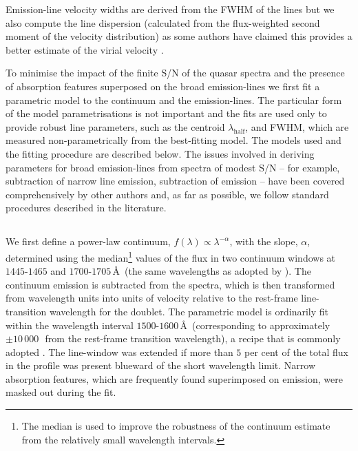Emission-line velocity widths are derived from the FWHM of the lines but we also compute the line dispersion (calculated from the flux-weighted second moment of the velocity distribution) as some authors have claimed this provides a better estimate of the virial velocity \citep{denney13}. 

To minimise the impact of the finite S/N of the quasar spectra and the presence of absorption features superposed on the broad emission-lines we first fit a parametric model to the continuum and the emission-lines. 
The particular form of the model parametrisations is not important and the fits are used only to provide robust line parameters, such as the centroid $\lambda_{\text{half}}$, and FWHM, which are measured non-parametrically from the best-fitting model. 
The models used and the fitting procedure are described below. 
The issues involved in deriving parameters for broad emission-lines from spectra of modest S/N -- for example, subtraction of narrow line emission, subtraction of  emission -- have been covered comprehensively by other authors \citep[e.g.][]{shen11,shen12,denney13,shen16a} and, as far as possible, we follow standard procedures described in the literature. 

\subsection{}
\label{sec:civ}

We first define a power-law continuum, $f(\lambda) \propto \lambda^{-\alpha}$, with the slope, $\alpha$, determined using the median\footnote{The median is used to improve the robustness of the continuum estimate from the relatively small wavelength intervals.} values of the flux in two continuum windows at $1445$-$1465$ and $1700$-$1705$\,\AA\, (the same wavelengths as adopted by \citealt{shen11}). 
The continuum emission is subtracted from the spectra, which is then transformed from wavelength units into units of velocity relative to the rest-frame line-transition wavelength for the  doublet.
The parametric model is ordinarily fit within the wavelength interval $1500$-$1600$\,\AA\, (corresponding to approximately $\pm 10\,000$\,\kms\, from the rest-frame transition wavelength), a recipe that is commonly adopted \citep[e.g.][]{shen11,denney13}. 
The line-window was extended if more than $5$ per cent of the total flux in the profile was present blueward of the short wavelength limit. 
Narrow absorption features, which are frequently found superimposed on  emission, were masked out during the fit. 


